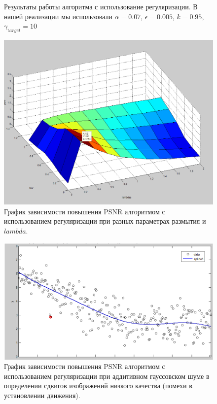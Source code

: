 \begin{figure}[p]
  \centering
  
  \caption{Результаты работы алгоритма с использование регуляризации. В нашей
    реализации мы использовали $\alpha = 0.07$, $ \epsilon=0.005$, $ k=0.95$, $ \gamma_{\mathrm target}=10$ \label{plot_sr2}}
\end{figure}

\begin{figure}[p]
  \centering
  \includegraphics[width=12cm]{img/blur_lambda.png}
  \caption{ График зависимости повышения PSNR алгоритмом с использованием регуляризации при разных параметрах размытия и
    $lambda$.\label{fig:blur_lambda}}
\end{figure}

\begin{figure}[p]
  \centering
  \includegraphics[width=12cm]{img/warps_noise.png}
  \caption{График зависимости повышения PSNR алгоритмом с использованием регуляризации при аддитивном гауссовском шуме в
    определении сдвигов изображений низкого качества (помехи в установлении движения). \label{fig:warps_noise}}
\end{figure}

